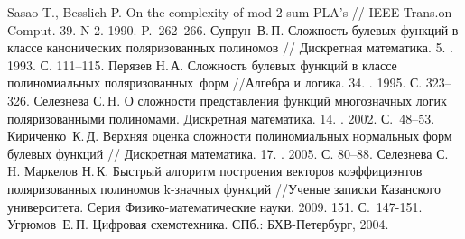 \documentclass[a4paper, 14pt]{extarticle}
\begin{document}
\begin{thebibliography}{0}
 Sasao T., Besslich P. On the complexity of mod-2 sum PLA’s  // IEEE Trans.on Comput. 39. N 2. 1990. P.~262--266. 
 Супрун~В.\,П. Сложность булевых функций в классе канонических поляризованных полиномов // Дискретная математика. 5.
    . 1993. С. 111--115. 
 Перязев Н.\,А. Сложность булевых функций в классе полиномиальных поляризованных~форм //Алгебра и логика. 34.
    . 1995. С. 323--326. 
 Селезнева С.\,H. О сложности представления функций многозначных логик поляризованными полиномами. Дискретная
    математика. 14. . 2002. С.~48--53.
 Кириченко~К.\,Д. Верхняя оценка сложности полиномиальных нормальных форм булевых функций 
    // Дискретная математика. 17. . 2005. С. 80--88.
 Селезнева С.\,H. Маркелов Н.\,К. Быстрый алгоритм построения векторов коэффициэнтов поляризованных полиномов
    k-значных функций //Ученые записки Казанского университета. Серия Физико-математические науки. 2009. 151.
     С.~147-151.
 Угрюмов~Е.\,П. Цифровая схемотехника. СПб.: БХВ-Петербург, 2004. 

\end{thebibliography}
\end{document}
